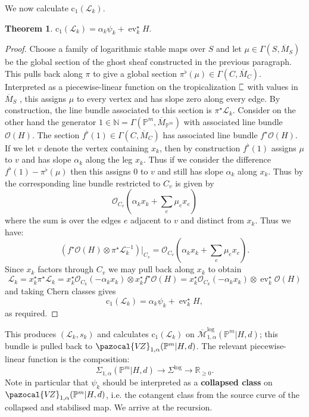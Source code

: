 \documentclass[11pt]{amsart}
\newcommand{\sqC}{\scalebox{0.8}[1.3]{$\sqsubset$}}
\newcommand{\MLog}{\overline{\mathcal{M}}^{\operatorname{log}}}
\newcommand{\PP}{\mathbb P}
\newcommand{\VZ}{\pazocal{V\!Z}}
\newcommand{\st}{\star}
\newcommand{\N}{\mathbb{N}}
\newcommand{\OO}{\mathcal{O}}
\renewcommand{\to}{\rightarrow}
\newcommand{\ev}{\operatorname{ev}}
\newcommand{\Lcal}{\mathcal{L}}
\newcommand{\cchern}{\mathrm{c}}
\newcommand{\ol}[1]{\overline{#1}}
\newcommand{\RR}{\mathbb{R}}
\theoremstyle{definition}
\newtheorem{thm}{Theorem}[section]
\theoremstyle{definition}
\begin{document}
We now calculate $\cchern_1(\Lcal_k)$. 
\begin{thm} $\cchern_1(\Lcal_k) = \alpha_k \psi_k + \ev_k^\st H.$\end{thm}
\begin{proof}
Choose a family of logarithmic stable maps over $S$ and let $\mu \in \Gamma(S,\ol{M}_S)$ be the global section of the ghost sheaf constructed in the previous paragraph. This pulls back along $\pi$ to give a global section $\pi^\flat(\mu) \in \Gamma(C,\ol{M}_C)$.  Interpreted as a piecewise-linear function on the tropicalization $\sqC$ with values in $\ol{M}_S$ \cite[Remark 7.3]{CavalieriChanUlirschWise}, this assigns $\mu$ to every vertex and has slope zero along every edge. By construction, the line bundle associated to this section is $\pi^\st \Lcal_k$. Consider on the other hand the generator $1 \in \N = \Gamma(\PP^m,\ol{M}_{\PP^m})$ with associated line bundle $\OO(H)$. The section $f^\flat(1) \in \Gamma(C,\ol{M}_C)$ has associated line bundle $f^\st\OO(H)$. If we let $v$ denote the vertex containing $x_k$, then by construction $f^\flat(1)$ assigns $\mu$ to $v$ and has slope $\alpha_k$ along the leg $x_k$. Thus if we consider the difference $f^\flat(1) - \pi^\flat(\mu)$ then this assigns $0$ to $v$ and still has slope $\alpha_k$ along $x_k$. Thus by \cite[Proposition 2.4.1]{RSPW} the corresponding line bundle restricted to $C_v$ is given by
\begin{equation*} \OO_{C_v} \left(\alpha_k x_k + \sum_e \mu_e x_e \right) \end{equation*}
where the sum is over the edges $e$ adjacent to $v$ and distinct from $x_k$. Thus we have:
\begin{equation*} \left( f^\st\OO(H) \otimes \pi^\st \Lcal_k^{-1} \right) \big|_{C_v} = \OO_{C_v} \left(\alpha_k x_k + \sum_e \mu_e x_e \right).\end{equation*}
Since $x_k$ factors through $C_v$ we may pull back along $x_k$ to obtain
\begin{equation*} \Lcal_k = x_k^\st\pi^\st \Lcal_k = x_k^\st \OO_{C_k}(-\alpha_k x_k) \otimes x_k^\st f^\st\OO(H) = x_k^\st \OO_{C_k}(-\alpha_k x_k) \otimes \ev_k^\st \OO(H) \end{equation*}
and taking Chern classes gives
\begin{equation*} \cchern_1(\Lcal_k) = \alpha_k \psi_k + \ev_k^\st H,\end{equation*}
as required.\end{proof}
This produces $(\Lcal_k,s_k)$ and calculates $\cchern_1(\Lcal_k)$ on $\MLog_{1,\alpha}(\PP^m|H,d)$; this bundle is pulled back to $\VZ_{1,\alpha}(\PP^m|H,d)$. The relevant piecewise-linear function is the composition:
\begin{equation*} \Sigma_{1,\alpha}(\PP^m|H,d) \to \Sigma^{\log} \to \RR_{\geq 0}.\end{equation*}
Note in particular that $\psi_k$ should be interpreted as a \textbf{collapsed class} on $\VZ_{1,\alpha}(\PP^m|H,d)$, i.e. the cotangent class from the source curve of the collapsed and stabilised map. We arrive at the recursion. 
\end{document}
